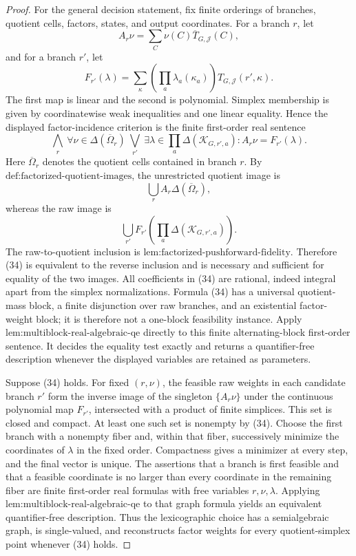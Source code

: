 \documentclass{article}
\begin{document}
\begin{proof}
For the general decision statement, fix finite orderings of branches, quotient cells, factors, states, and output coordinates.  For a branch \(r\), let
\[
A_r\nu=\sum_C\nu(C)\overline T_{G,\mathcal J}(C),
\]
and for a branch \(r'\), let
\[
F_{r'}(\lambda)
=\sum_\kappa\left(\prod_a\lambda_a(\kappa_a)\right)
T_{G,\mathcal J}(r',\kappa).
\]
The first map is linear and the second is polynomial.  Simplex membership is given by coordinatewise weak inequalities and one linear equality.  Hence the displayed factor-incidence criterion is the finite first-order real sentence
\[
\bigwedge_r\ \forall\nu\in\Delta(\overline\Omega_r)\ 
\bigvee_{r'}\ \exists\lambda\in\prod_a\Delta(\mathcal K_{G,r',a}):
A_r\nu=F_{r'}(\lambda).
\tag{34}
\]
Here \(\overline\Omega_r\) denotes the quotient cells contained in branch \(r\).  By \(\text{def:factorized-quotient-images}\), the unrestricted quotient image is
\[
\bigcup_r A_r\Delta(\overline\Omega_r),
\]
whereas the raw image is
\[
\bigcup_{r'}F_{r'}\left(\prod_a\Delta(\mathcal K_{G,r',a})\right).
\]
The raw-to-quotient inclusion is \(\text{lem:factorized-pushforward-fidelity}\).  Therefore (34) is equivalent to the reverse inclusion and is necessary and sufficient for equality of the two images.  All coefficients in (34) are rational, indeed integral apart from the simplex normalizations.  Formula (34) has a universal quotient-mass block, a finite disjunction over raw branches, and an existential factor-weight block; it is therefore not a one-block feasibility instance.  Apply \(\text{lem:multiblock-real-algebraic-qe}\) directly to this finite alternating-block first-order sentence.  It decides the equality test exactly and returns a quantifier-free description whenever the displayed variables are retained as parameters.

Suppose (34) holds.  For fixed \((r,\nu)\), the feasible raw weights in each candidate branch \(r'\) form the inverse image of the singleton \(\{A_r\nu\}\) under the continuous polynomial map \(F_{r'}\), intersected with a product of finite simplices.  This set is closed and compact.  At least one such set is nonempty by (34).  Choose the first branch with a nonempty fiber and, within that fiber, successively minimize the coordinates of \(\lambda\) in the fixed order.  Compactness gives a minimizer at every step, and the final vector is unique.  The assertions that a branch is first feasible and that a feasible coordinate is no larger than every coordinate in the remaining fiber are finite first-order real formulas with free variables \(r,\nu,\lambda\).  Applying \(\text{lem:multiblock-real-algebraic-qe}\) to that graph formula yields an equivalent quantifier-free description.  Thus the lexicographic choice has a semialgebraic graph, is single-valued, and reconstructs factor weights for every quotient-simplex point whenever (34) holds.


\end{proof}
\end{document}
